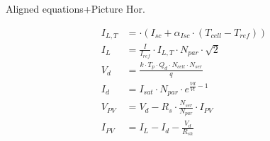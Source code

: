 \documentclass[xcolor=dvipsnames,aspectratio=169]{beamer} %
\begin{document}
\begin{frame}[noframenumbering]{Aligned equations+Picture Hor.}

\vspace{-12pt}

\begin{minipage}{0.4\paperwidth}

\begin{align*}
    I_{L,T} &= \cdot (I_{sc}+\alpha_{Isc} \cdot (T_{cell}-T_{ref})) \\
    I_L &= \frac{I}{I_{ref}} \cdot I_{L,T} \cdot N_{par} \cdot \sqrt{2} \\
    V_d &= \frac{k \cdot T_p \cdot Q_d \cdot N_{cell} \cdot N_{ser}}{q} \\
    I_d &= I_{sat} \cdot N_{par} \cdot e^{\frac{Vd}{Vt}-1} \\
    V_{PV} &= V_d-R_s \cdot \frac{N_{ser}}{N_{par}} \cdot I_{PV} \\
    I_{PV} &= I_L-I_d-\frac{V_d}{R_{sh}}
\end{align*}

\end{minipage}
\begin{minipage}{0.5\paperwidth}


\end{minipage}

\end{frame}

\end{document}
